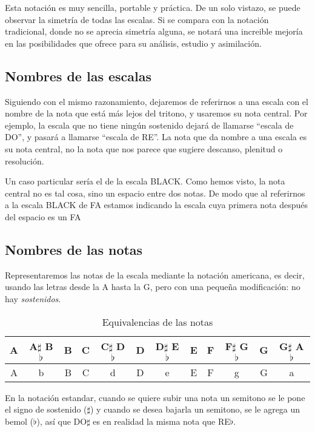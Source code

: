 \documentclass[]{report}
\begin{document}
Esta notación es muy sencilla, portable y práctica. De un solo vistazo, se puede observar la simetría de todas las escalas. Si se compara con la notación tradicional, donde no se aprecia simetría alguna, se notará una increible mejoría en las posibilidades que ofrece para su análisis, estudio y asimilación.

\subsection{Nombres de las escalas}
Siguiendo con el mismo razonamiento, dejaremos de referirnos a una escala con el nombre de la nota que está más lejos del tritono, y usaremos su nota central. Por ejemplo, la escala que no tiene ningún sostenido dejará de llamarse ``escala de DO'', y pasará a llamarse ``escala de RE''. La nota que da nombre a una escala es su nota central, no la nota que nos parece que sugiere descanso, plenitud o resolución.

Un caso particular sería el de la escala \textsf{BLACK}. Como hemos visto, la nota central no es tal cosa, sino un espacio entre dos notas. De modo que al referirnos a la escala \textsf{BLACK} de FA estamos indicando la escala cuya primera nota después del espacio es un FA

\subsection{Nombres de las notas}

Representaremos las notas de la escala mediante la notación americana, es decir, usando las letras desde la A hasta la G, pero con una pequeña modificación: no hay \emph{sostenidos}.

\begin{table}[htbp]
  \centering
  \begingroup
  \sffamily
  \begin{tabular}{*{12}{c}}
    \toprule    
    A & A$\sharp$ B$\flat$ & B & C & C$\sharp$ D$\flat$ & D & D$\sharp$ E$\flat$ & E & F & F$\sharp$ G$\flat$ & G & G$\sharp$ A$\flat$ \\
    \midrule    
    A & b & B & C & d & D & e & E & F & g & G & a \\    
    \bottomrule
  \end{tabular}
  \endgroup
  \caption{Equivalencias de las notas}\label{tab:note-equivalences}
\end{table}

En la notación estandar, cuando se quiere subir una nota un semitono se le pone el signo de sostenido ($\sharp$) y cuando se desea bajarla un semitono, se le agrega un bemol ($\flat$), así que DO$\sharp$ es en realidad la misma nota que RE$\flat$.
\end{document}
